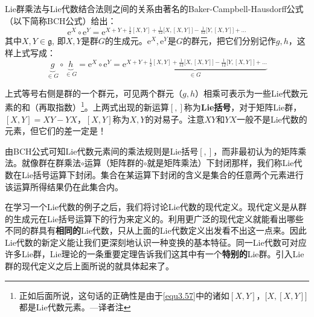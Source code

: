Lie群乘法与Lie代数结合法则之间的关系由著名的Baker-Campbell-Hausdorff公式（以下简称BCH公式）给出：
\begin{equation}
\label{equ3.56}
\mathrm{e}^X \circ \mathrm{e}^Y = \mathrm{e}^{X + Y + \frac{1}{2}[X, Y] + \frac{1}{12} \big[X, [X, Y]\big] - \frac{1}{12} \big[Y, [X, Y]\big] + \dots  }
\end{equation}
其中$X, Y \in \mathfrak{g}$, 即$X, Y$是群$G$的生成元。$\mathrm{e}^X, \mathrm{e}^Y$是$G$的群元，把它们分别记作$g, h$，这样上式写成：
\begin{equation}
\label{equ3.57}
\underbrace{g}_{\in G} \circ \underbrace{h}_{\in G} = \mathrm{e}^X \circ \mathrm{e}^Y = \underbrace{\mathrm{e}^{ X + Y + \frac{1}{2} [X, Y] + \frac{1}{12}\big[X, [X, Y]\big] - \frac{1}{12} \big[Y, [X, Y]\big] + \dots }}_{\in G}
\end{equation}

上式等号右侧是群的一个群元，可见两个群元（$g,h$）相乘可表示为一些Lie代数元素的和（再取指数）\footnote{正如后面所说，这句话的正确性是由于\eqref{equ3.57}中的诸如$[X, Y]$，$\big[X, [X, Y]\big]$都是Lie代数元素。---译者注}。上两式出现的新运算$[,]$称为{\bf Lie括号}，对于矩阵Lie群，$[X, Y] = XY - YX$，$[X, Y]$称为$X, Y$的对易子。注意$XY$和$YX$一般不是Lie代数的元素，但它们的差一定是！

由BCH公式可知Lie代数元素间的乘法规则是Lie括号$[,]$，而非最初认为的矩阵乘法。就像群在群乘法$\circ$运算（矩阵群的$\circ$就是矩阵乘法）下封闭那样，我们称Lie代数在Lie括号运算下封闭。集合在某运算下封闭的含义是集合的任意两个元素进行该运算所得结果仍在此集合内。

在学习一个Lie代数的例子之后，我们将讨论Lie代数的现代定义。现代定义是从群的生成元在Lie括号运算下的行为来定义的。利用更广泛的现代定义就能看出哪些不同的群具有{\bf 相同的}Lie代数，只从上面的Lie代数定义出发看不出这一点来。因此Lie代数的新定义能让我们更深刻地认识一种变换的基本特征。同一Lie代数可对应许多Lie群，Lie理论的一条重要定理告诉我们这其中有一个{\bf 特别的}Lie群。引入Lie群的现代定义之后上面所说的就具体起来了。

